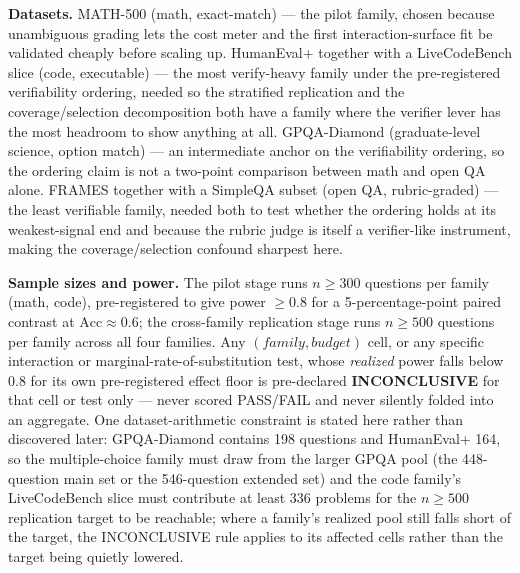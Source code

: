 \documentclass[11pt]{article}
\begin{document}
\textbf{Datasets.} MATH-500 (math, exact-match) --- the pilot family, chosen because unambiguous grading lets the cost meter and the first interaction-surface fit be validated cheaply before scaling up. HumanEval+ together with a LiveCodeBench slice (code, executable) --- the most verify-heavy family under the pre-registered verifiability ordering, needed so the stratified replication and the coverage/selection decomposition both have a family where the verifier lever has the most headroom to show anything at all. GPQA-Diamond (graduate-level science, option match) --- an intermediate anchor on the verifiability ordering, so the ordering claim is not a two-point comparison between math and open QA alone. FRAMES together with a SimpleQA subset (open QA, rubric-graded) --- the least verifiable family, needed both to test whether the ordering holds at its weakest-signal end and because the rubric judge is itself a verifier-like instrument, making the coverage/selection confound sharpest here.

\textbf{Sample sizes and power.} The pilot stage runs $n \geq 300$ questions per family (math, code), pre-registered to give power $\geq 0.8$ for a 5-percentage-point paired contrast at $\text{Acc} \approx 0.6$; the cross-family replication stage runs $n \geq 500$ questions per family across all four families. Any $(family, budget)$ cell, or any specific interaction or marginal-rate-of-substitution test, whose \emph{realized} power falls below 0.8 for its own pre-registered effect floor is pre-declared \textbf{INCONCLUSIVE} for that cell or test only --- never scored PASS/FAIL and never silently folded into an aggregate. One dataset-arithmetic constraint is stated here rather than discovered later: GPQA-Diamond contains 198 questions and HumanEval+ 164, so the multiple-choice family must draw from the larger GPQA pool (the 448-question main set or the 546-question extended set) and the code family's LiveCodeBench slice must contribute at least 336 problems for the $n \geq 500$ replication target to be reachable; where a family's realized pool still falls short of the target, the INCONCLUSIVE rule applies to its affected cells rather than the target being quietly lowered.
\end{document}

